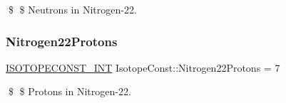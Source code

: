 \$ \$ Neutrons in Nitrogen-\/22. \mbox{\label{group___isotope_const-_nitrogen-_n22_ga45dbd5455db10b27267fd703e4c8d866}} 
\subsubsection{\texorpdfstring{Nitrogen22\+Protons}{Nitrogen22Protons}}
{\footnotesize\ttfamily \mbox{\hyperlink{group___isotope_const-_macros_ga5f18360b3e99483a35c32d789e62621c}{I\+S\+O\+T\+O\+P\+E\+C\+O\+N\+S\+T\+\_\+\+I\+NT}} Isotope\+Const\+::\+Nitrogen22\+Protons = 7}

\$ \$ Protons in Nitrogen-\/22. 